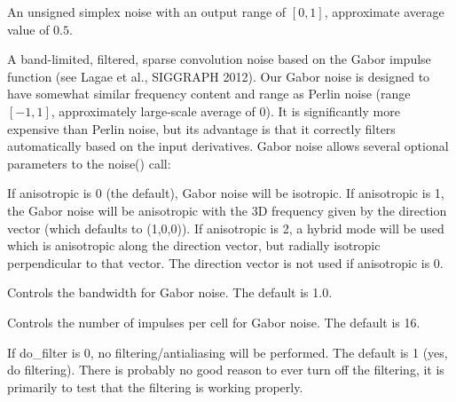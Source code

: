 \documentclass[11pt,letterpaper]{book}
\begin{document}
\vspace{12pt}
An unsigned simplex noise with an output range of $[0,1]$,
approximate average value of $0.5$.
\apiend

\vspace{12pt}
A band-limited, filtered, sparse convolution noise based on the
Gabor impulse function (see Lagae et al., SIGGRAPH 2012).  Our Gabor
noise is designed to have somewhat similar frequency content and range
as Perlin noise (range $[-1,1]$, approximately large-scale average of
$0$).  It is significantly more expensive than Perlin noise, but its
advantage is that it correctly filters automatically based on the input
derivatives.  Gabor noise allows several optional parameters to the
{\cf noise()} call:

\vspace{12pt}
If {\cf anisotropic} is 0 (the default), Gabor noise
will be isotropic.  If {\cf anisotropic} is 1, the Gabor noise will
be anisotropic with the 3D frequency given by the {\cf direction} 
vector (which defaults to {\cf (1,0,0)}).  If {\cf anisotropic} is
2, a hybrid mode will be used which is anisotropic along the
{\cf direction} vector, but radially isotropic perpendicular to that
vector.  The {\cf direction} vector is not used if {\cf anisotropic}
is 0.
\apiend
\vspace{-16pt}

\vspace{12pt}
Controls the bandwidth for Gabor noise.
The default is 1.0.
\apiend
\vspace{-16pt}

\vspace{12pt}
Controls the number of impulses per cell for Gabor noise.
The default is 16.
\apiend
\vspace{-16pt}

\vspace{12pt}
If {\cf do_filter} is 0, no filtering/antialiasing will
be performed.  The default is 1 (yes, do filtering).  There is probably
no good reason to ever turn off the filtering, it is primarily to test
that the filtering is working properly.
\apiend
\vspace{-16pt}

\apiend

\end{document}
